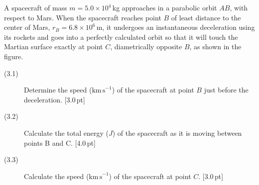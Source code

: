 A spacecraft of mass $m = 5.0 \times 10^4$\,kg approaches in a parabolic orbit
$AB$, with respect to Mars. When the spacecraft reaches point $B$ of least
distance to the center of Mars, $r_B = 6.8 \times 10^6$\,m, it undergoes an
instantaneous deceleration using its rockets and goes into a perfectly
calculated orbit so that it will touch the Martian surface exactly at point
$C$, diametrically opposite $B$, as shown in the figure.


\begin{description}
\item[(3.1)] Determine the speed ($\mathrm{km\,s}^{-1}$) of the spacecraft at
  point $B$ just before the deceleration. \hfill[3.0\,pt]
\item[(3.2)] Calculate the total energy ($J$) of the spacecraft as it is
  moving between points B and C. \hfill[4.0\,pt]
\item[(3.3)] Calculate the speed ($\mathrm{km\,s}^{-1}$) of the spacecraft at
  point $C$. \hfill[3.0\,pt]
\end{description}
